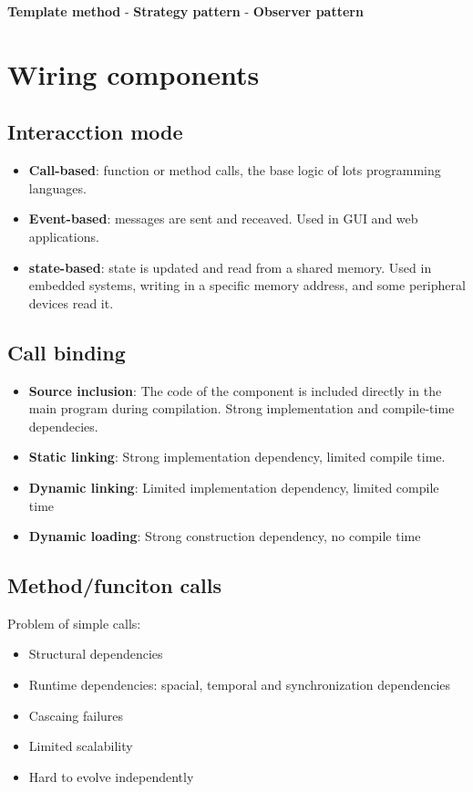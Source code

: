 \textbf{Template method} - \textbf{Strategy pattern} - \textbf{Observer pattern}


\section{Wiring components}


\subsection{Interacction mode}

\begin{itemize}
  \item \textbf{Call-based}: function or method calls, the base logic of lots
        programming languages.
  \item \textbf{Event-based}: messages are sent and receaved. Used in GUI and
        web applications.
  \item \textbf{state-based}: state is updated and read from a shared memory.
        Used in embedded systems, writing in a specific memory address, and some peripheral devices read  it.
\end{itemize}


\subsection{Call binding}

\begin{itemize}
  \item \textbf{Source inclusion}: The code of the component is included
        directly in the main program during compilation. Strong implementation and compile-time dependecies.
  \item \textbf{Static linking}: Strong implementation dependency,
        limited compile time.
  \item \textbf{Dynamic linking}: Limited implementation dependency,
        limited compile time
  \item \textbf{Dynamic loading}: Strong construction dependency, no
        compile time
\end{itemize}

\subsection{Method/funciton calls}

Problem of simple calls:

\begin{itemize}
  \item Structural dependencies
  \item Runtime dependencies: spacial, temporal and synchronization dependencies
  \item Cascaing failures
  \item Limited scalability
  \item Hard to evolve independently
\end{itemize}

